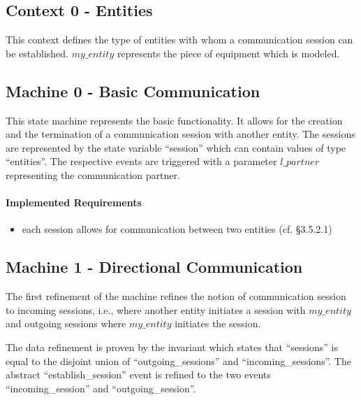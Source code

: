 \documentclass{template/openetcs_article}
\begin{document}
\subsection{Context 0 - Entities}
\label{sec:context-0-entities}

This context defines the type of entities with whom a communication session can
be established.  $my\_entity$ represents the piece of equipment which is
modeled.



\subsection{Machine 0 - Basic Communication}
\label{sec:machine-0-basic}

This state machine represents the basic functionality. It allows for the
creation and the termination of a communication session with another entity. The
sessions are represented by the state variable ``session'' which can contain
values of type ``entities''. The respective events are triggered with a
parameter $l\_partner$ representing the communication partner.

\paragraph{Implemented Requirements}
\label{sec:impl-requ}

\begin{itemize}
\item each session allows for communication between two entities (cf. §3.5.2.1)
\end{itemize}



\subsection{Machine 1 - Directional Communication}
\label{sec:mach-1-direct}

The first refinement of the machine refines the notion of communication session
to incoming sessions, i.e., where another entity initiates a session with
$my\_entity$ and outgoing sessions where $my\_entity$ initiates the session.

The data refinement is proven by the invariant which states that ``sessions'' is
equal to the disjoint union of ``outgoing\_sessions'' and
``incoming\_sessions''. The abstract ``establish\_session'' event is refined to
the two events ``incoming\_session'' and ``outgoing\_session''.
\end{document}
